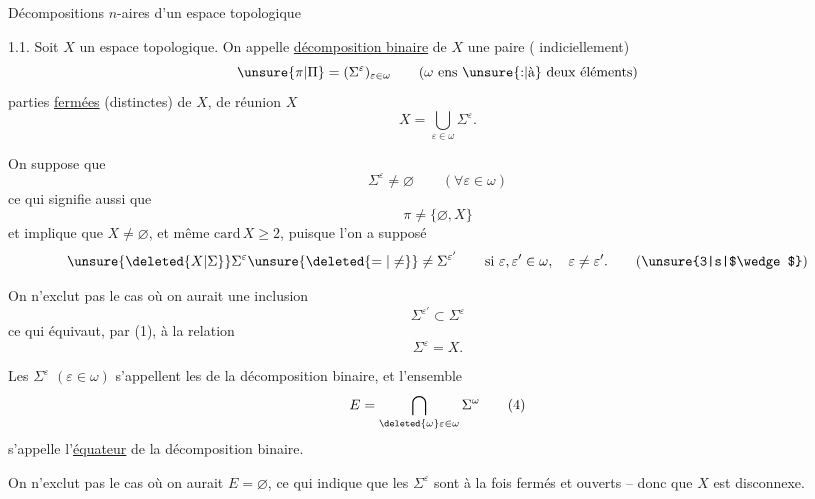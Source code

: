 \begingroup
\makeatletter\tagsleft@true\makeatother

\noindent Décompositions $n$-aires d'un espace topologique

1.1. Soit $X$ un espace topologique. On appelle \uline{décomposition binaire} de $X$ une paire ( indiciellement)
\[
\unsure{\pi|\Pi}=(\Sigma^\varepsilon)_{\varepsilon\in\omega}\qquad(\omega\ \text{ens \unsure{:|à} deux éléments})
\]
  parties \uline{fermées} (distinctes) de $X$, de réunion $X$
\[
X=\bigcup_{\varepsilon\in\omega}\Sigma^\varepsilon.\tag*{(1)}
\]

On suppose que
\[
\Sigma^\varepsilon\ne\varnothing\qquad(\forall\varepsilon\in\omega)\tag*{(2)}
\]
ce qui signifie aussi que
\[
\pi\ne\{\varnothing,X\}\tag*{$(2')$}
\]
et implique que $X\ne\varnothing$, et même $\mathrm{card}\,X\geq 2$, puisque l'on a supposé
\[
\unsure{\deleted{X|\Sigma}}\Sigma^\varepsilon\unsure{\deleted{=|\ne}}\ne\Sigma^{\varepsilon'}\qquad\text{si }\varepsilon,\varepsilon'\in\omega,\quad\varepsilon\ne\varepsilon'.\tag*{(\unsure{3|s|$\wedge$})}
\]

On n'exclut pas le cas où on aurait une inclusion
\[
\Sigma^{\varepsilon'}\subset\Sigma^\varepsilon
\]
ce qui équivaut, par (1), à la relation
\[
\Sigma^\varepsilon=X.
\]

Les $\Sigma^\varepsilon$ $(\varepsilon\in\omega)$ s'appellent les \uline{} de la décomposition binaire,  et l'ensemble
\[
E=\bigcap_{\deleted{\omega}\varepsilon\in\omega}\Sigma^\omega\tag*{(4)}
\]
s'appelle l'\uline{équateur} de la décomposition binaire.

On n'exclut pas le cas où on aurait $E=\varnothing$, ce qui indique que les $\Sigma^\varepsilon$ \inserted{$(\varepsilon\in\omega)$} sont  à la fois fermés et ouverts -- donc que $X$ est disconnexe.
\endgroup
